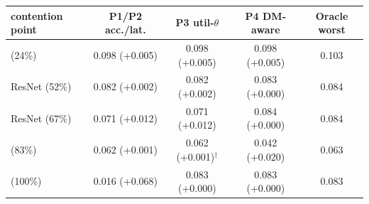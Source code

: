 \begin{tabular}{lccc|c}
\toprule
contention point & P1/P2 acc./lat. & P3 util-$\theta$ & P4 DM-aware & Oracle worst \\
\midrule
\Lcnn{} (24\%) & 0.098 (+0.005) & 0.098 (+0.005) & 0.098 (+0.005) & 0.103 \\
ResNet (52\%) & 0.082 (+0.002) & 0.082 (+0.002) & 0.083 (+0.000) & 0.084 \\
ResNet (67\%) & 0.071 (+0.012) & 0.071 (+0.012) & 0.084 (+0.000) & 0.084 \\
\Llm{} (83\%) & 0.062 (+0.001) & 0.062 (+0.001)$^\dagger$ & 0.042 (+0.020) & 0.063 \\
\Lvlm{} (100\%) & 0.016 (+0.068) & 0.083 (+0.000) & 0.083 (+0.000) & 0.083 \\
\bottomrule
\end{tabular}
